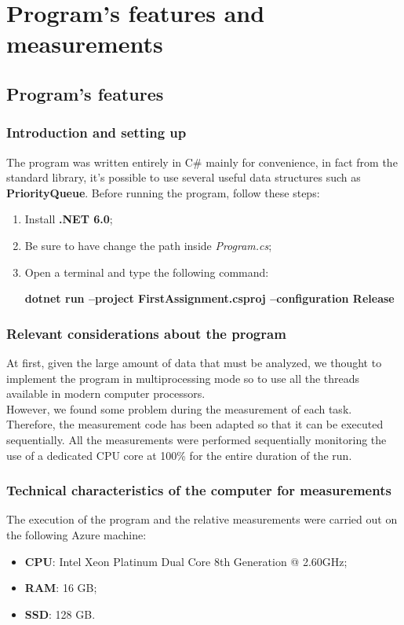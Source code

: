 \section{Program's features and measurements}

\subsection{Program's features}

\subsubsection{Introduction and setting up}
The program was written entirely in C\# mainly for convenience, in fact from the standard library, it's possible to 
use several useful data structures such as \textbf{PriorityQueue}.
Before running the program, follow these steps:
\begin{enumerate}
    \item Install \textbf{.NET 6.0};
    \item Be sure to have change the path inside \textit{Program.cs};
    \item Open a terminal and type the following command:\\
        \centerline{\textbf{dotnet run --project FirstAssignment.csproj --configuration Release}}
\end{enumerate}

\subsubsection{Relevant considerations about the program}
At first, given the large amount of data that must be analyzed, we thought to implement the program in multiprocessing
mode so to use all the threads available in modern computer processors. \\
\noindent
However, we found some problem during the measurement of each task.
Therefore, the measurement code has been adapted so that it can be executed sequentially.
All the measurements were performed sequentially monitoring the use of a dedicated CPU core at 100\% for the entire 
duration of the run.

\subsubsection{Technical characteristics of the computer for measurements}
The execution of the program and the relative measurements were carried out on the following Azure machine:
\begin{itemize}
    \item \textbf{CPU}: Intel Xeon Platinum Dual Core 8th Generation @ 2.60GHz;
    \item \textbf{RAM}: 16 GB;
    \item \textbf{SSD}: 128 GB.
\end{itemize}

